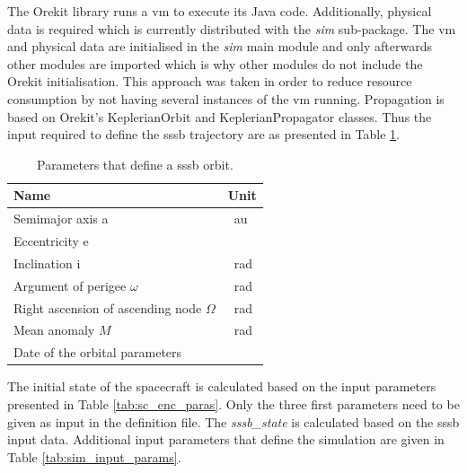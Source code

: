 The Orekit library runs a \gls{vm} to execute its Java code. Additionally, physical data is required which is currently distributed with the \textit{sim} sub-package. The \gls{vm} and physical data are initialised in the \textit{sim} main module and only afterwards other modules are imported which is why other modules do not include the Orekit initialisation. This approach was taken in order to reduce resource consumption by not having several instances of the \gls{vm} running. Propagation is based on Orekit's KeplerianOrbit and KeplerianPropagator classes. Thus the input required to define the \gls{sssb} trajectory are as presented in Table \ref{tab:keplerorbit_params}.

\begin{table}[htpb]
    \centering
    \caption{Parameters that define a \gls{sssb} orbit.}
    \label{tab:keplerorbit_params}
    \begin{tabular}{p{}|p{}}
        \textbf{Name}    & \textbf{Unit} \\ \hline
        Semi\-major axis a & \SI{}{\astronomicalunit} \\
        Eccentricity e & \SI{}{} \\
        Inclination i & \SI{}{\radian} \\
        Argument of perigee  $\omega$ & \SI{}{\radian}  \\
        Right ascension of ascending node $\Omega$ & \SI{}{\radian} \\
        Mean anomaly $M$ & \SI{}{\radian}\\
        Date of the orbital parameters &  
    \end{tabular}
\end{table}

The initial state of the spacecraft is calculated based on the input parameters presented in Table \ref{tab:sc_enc_paras}. Only the three first parameters need to be given as input in the definition file. The \textit{sssb\_state} is calculated based on the \gls{sssb} input data. Additional input parameters that define the simulation are given in Table \ref{tab:sim_input_params}.

